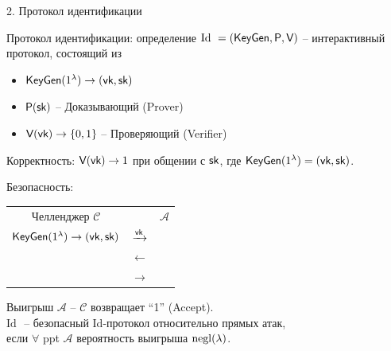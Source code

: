 \documentclass[usenames,dvipsnames,8pt,aspectratio=169]{beamer}
\begin{document}
\begin{frame}

\begin{LARGE}


\color{Orange}
2. Протокол идентификации

\end{LARGE}
\end{frame}

\begin{frame}{Протокол идентификации:  определение}
\Large
$\text{Id } = (\textsf{KeyGen}, \textsf{P}, \textsf{V})$ -- интерактивный протокол, состоящий из 

\begin{itemize}
\itemsep 7pt
\item $\textsf{KeyGen}(1^\lambda) \rightarrow (\textsf{vk}, \textsf{sk})$ 
\item $\textsf{P}(\textsf{sk})$ -- Доказывающий (Prover)
\item $\textsf{V}(\textsf{vk}) \rightarrow \{0,1\}$ -- Проверяющий (Verifier)
\end{itemize}

\vspace{10pt}

{\color{Orange} Корректность:} $\textsf{V}(\textsf{vk}) \rightarrow 1$ при общении с $\textsf{\textsf{sk}}$, где $\textsf{KeyGen}(1^\lambda) = (\textsf{vk}, \textsf{sk})$.

\vspace{10pt}

{\color{Orange} Безопасность:}
\begin{tabular}{c c c}
{\color{Orange} Челленджер $\mathcal{C}$ } & & {\color{Orange} $\mathcal{A}$ } \\ 
$\textsf{KeyGen}(1^\lambda) \rightarrow (\textsf{vk}, \textsf{sk})$ & $\xrightarrow{\textsf{vk}}$ & \\[5pt]
& $\leftarrow$ & \\[-2pt]
& $\rightarrow$ & \\[2pt]

\end{tabular}
\vspace{10pt}

Выигрыш $\mathcal{A}$ --  $\mathcal{C}$ возвращает ``1'' (Accept). \\[5pt]

$\text{Id }$ -- безопасный Id-протокол относительно прямых атак,  \\ если $\forall $ ppt $\mathcal{A}$  вероятность выигрыша  $\mathrm{negl}(\lambda)$.

\end{frame}
\end{document}
